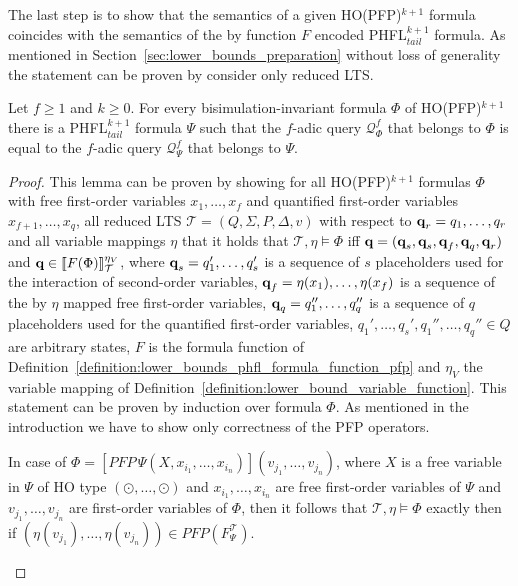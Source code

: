 The last step is to show that the semantics of a given HO(PFP)$^{k+1}$ formula coincides with the semantics of the by function $F$ encoded PHFL$^{k+1}_{tail}$ formula. As mentioned in Section~\ref{sec:lower_bounds_preparation} without loss of generality the statement can be proven by consider only  reduced LTS. 

\begin{lemma}
    \label{lemma:ho_pfp_equals_phfl_tail}
    Let $f \geq 1$ and $k \geq 0$. For every bisimulation-invariant formula $\Phi$ of HO(PFP)$^{k + 1}$ there is a
    PHFL$^{k+1}_{tail}$ formula $\Psi$ such that the $f$-adic query $\mathcal{Q}_\Phi^f$ that belongs to $\Phi$ is equal to the $f$-adic query  $\mathcal{Q}_\Psi^f$ that belongs to $\Psi$.
\end{lemma}

\begin{proof}
    This lemma can be proven by showing for all HO(PFP)$^{k+1}$ formulas $\Phi$ with free first-order variables $x_1,
    \dots, x_f$ and quantified first-order variables $x_{f+1}, \dots, x_q$, all reduced LTS $\mathcal{T} = (Q, \Sigma, P,
    \Delta, v)$ with respect to $\emph{q}_r = q_1, \dots, q_r$ and all variable mappings $\eta$ that it holds that $\mathcal{T}, \eta \models \Phi$ iff $\emph{q} =
    (\emph{q}_s, \emph{q}_s, \emph{q}_f, \emph{q}_q, \emph{q}_r)$ and $\emph{q} \in \llbracket
   F(\Phi)\rrbracket^{\eta_V}_{\mathcal{T}}$, where $\emph{q}_s = q_1',\dots,q_s'$ is a sequence of $s$ placeholders used for the interaction of second-order variables, $\emph{q}_f = \eta(x_1), \dots, \eta(x_f)$ is a sequence of the by $\eta$ mapped free first-order variables, $\emph{q}_q = q_1'', \dots, q_q''$ is a sequence of $q$ placeholders used for the quantified first-order variables, $q_1', \dots, q_s', q_1'', \dots, q_q'' \in Q$ are arbitrary states, $F$ is the formula function of
    Definition~\ref{definition:lower_bounds_phfl_formula_function_pfp} and $\eta_V$ the variable mapping of
    Definition~\ref{definition:lower_bound_variable_function}. This statement can be proven by induction over formula
    $\Phi$.
    As mentioned in the introduction we have to show only correctness of the PFP operators.
    \begin{compactitem}
    \item In case of $\Phi = [PFP\,\Psi(X, x_{i_1}, \dots, x_{i_n})](v_{j_1}, \dots, v_{j_n})$, where $X$ is a
        free variable in $\Psi$ of HO type $(\odot, \dots, \odot)$ and $x_{i_1}, \dots, x_{i_n}$ are free first-order
        variables of $\Psi$ and $v_{j_1}, \dots, v_{j_n}$ are first-order variables of $\Phi$, then it follows that
        $\mathcal{T}, \eta \models \Phi$ exactly then if $(\eta(v_{j_1}), \dots, \eta(v_{j_n})) \in PFP
        (F_\Psi^\mathcal{T})$. 
        

\end{compactitem}
\end{proof}
